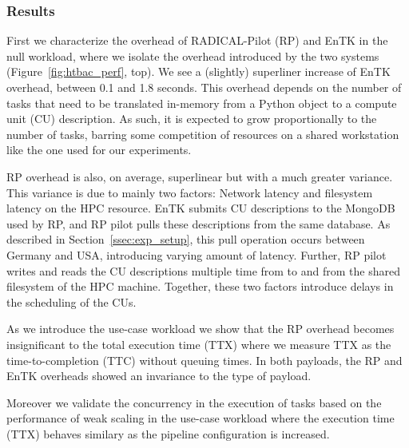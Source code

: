 \subsubsection{Results}\label{ssec:exp_results}

First we characterize the overhead of RADICAL-Pilot (RP) and EnTK in the 
null workload, where we isolate the %
overhead introduced by the two %
systems (Figure~\ref{fig:htbac_perf}, top). We see a (slightly) superliner
increase of EnTK overhead, between 0.1 and 1.8 seconds. This overhead depends
on the number of tasks that need to be translated in-memory from a Python
object to a compute unit (CU) description. As such, it is expected to grow
proportionally to the number of tasks, barring some competition of resources
on a shared workstation like the one used for our experiments.

RP overhead is also, on average, superlinear but with a much greater
variance. This variance is due to mainly two factors: Network latency and
filesystem latency on the HPC resource. EnTK submits CU descriptions to the
MongoDB used by RP, and RP pilot pulls these descriptions from the same
database. As described in Section~\ref{ssec:exp_setup}, this pull operation
occurs between Germany and USA, introducing varying amount of latency.
Further, RP pilot writes and reads the CU descriptions multiple time from to
and from the shared filesystem of the HPC machine. Together, these two
factors introduce delays in the scheduling of the CUs.



As we introduce the use-case workload we show that the RP overhead becomes
insignificant to the total execution time (TTX) where we measure TTX as the
time-to-completion (TTC) without queuing times. In both payloads, the RP and
EnTK overheads showed an invariance to the type of payload.

Moreover we validate the concurrency in the execution of tasks based on the
performance of weak scaling in the use-case workload where the execution time
(TTX) behaves similary as the pipeline configuration is increased.

